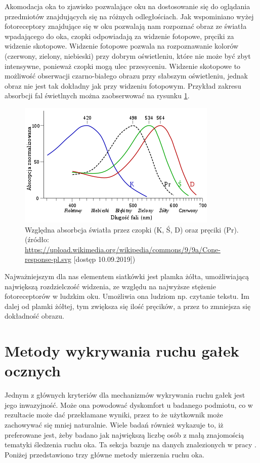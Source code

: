 Akomodacja oka to zjawisko pozwalające oku na dostosowanie się do oglądania przedmiotów znajdujących się na różnych odległościach. Jak wspominiano wyżej fotoreceptory znajdujące się w oku pozwalają nam rozpoznać obraz ze światła wpadającego do oka, czopki odpowiadają za widzenie fotopowe, pręciki za widzenie skotopowe. Widzenie fotopowe pozwala na rozpoznawanie kolorów (czerwony, zielony, niebieski) przy dobrym oświetleniu, które nie może być zbyt intensywne, ponieważ czopki mogą ulec przesyceniu. Widzenie skotopowe to możliwość obserwacji czarno-białego obrazu przy słabszym oświetleniu, jednak obraz nie jest tak dokładny jak przy widzeniu fotopowym. Przykład zakresu absorbcji fal świetlnych można zaobserwować na rysunku \ref{fig:czopki}.
\begin{figure}[H]
    \centering
    \captionsetup{justification=centering,margin=2cm}
    \includegraphics[width=0.9\linewidth]{resources/czopki.png}
    \caption[Względna absorbcja światła przez czopki oraz pręciki.]{Względna absorbcja światła przez czopki (K, Ś, D) oraz pręciki (Pr).\\\hspace{\textwidth}
    \small(źródło: \url{https://upload.wikimedia.org/wikipedia/commons/9/9a/Cone-response-pl.svg} [dostęp 10.09.2019])}
    \label{fig:czopki}
\end{figure}
Najważniejszym dla nas elementem siatkówki jest plamka żółta, umożliwiającą największą rozdzielczość widzenia, ze względu na najwyższe stężenie fotoreceptorów w ludzkim oku. Umożliwia ona ludziom np. czytanie tekstu. Im dalej od plamki żółtej, tym zwiększa się ilość pręcików, a przez to zmniejsza się dokładność obrazu.
\section{Metody wykrywania ruchu gałek ocznych}
\label{sec:movement}
Jednym z głównych kryteriów dla mechanizmów wykrywania ruchu gałek jest jego inwazyjność. Może ona powodować dyskomfort u badanego podmiotu, co w rezultacie może dać przekłamane wyniki, przez to że użytkownik może zachowywać się mniej naturalnie. Wiele badań również wykazuje to, iż preferowane jest, żeby badano jak największą liczbę osób z małą znajomością tematyki śledzenia ruchu oka. Ta sekcja bazuje na danych znalezionych w pracy \cite{metodyeyetrack}. Poniżej przedstawiono trzy główne metody mierzenia ruchu oka.\par

